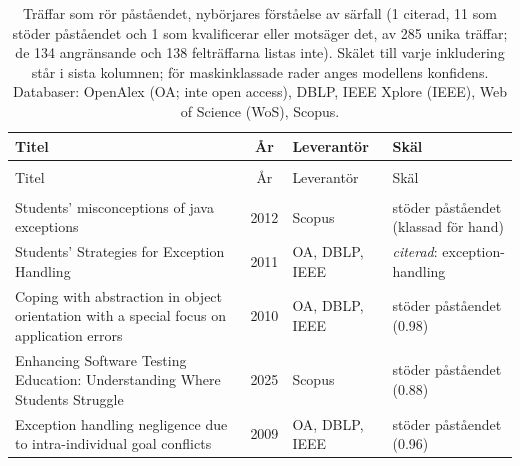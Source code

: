 
\begingroup\footnotesize
\begin{longtable}{@{}%
  >{\raggedright\arraybackslash}p{}c%
  >{\raggedright\arraybackslash}p{}%
  >{\raggedright\arraybackslash}p{}@{}}
\caption{Träffar som rör påståendet, nybörjares förståelse av särfall (1 citerad, 11 som stöder påståendet och 1 som kvalificerar eller motsäger det, av 285 unika träffar; de 134 angränsande och 138 felträffarna listas inte). Skälet till varje inkludering står i sista kolumnen; för maskinklassade rader anges modellens konfidens. Databaser: OpenAlex (OA; inte open access), DBLP, IEEE Xplore (IEEE), Web of Science (WoS), Scopus.}\label{tab:sok-nyborjare}\\
\toprule
Titel & År & Leverantör & Skäl \\
\midrule
\endfirsthead
\multicolumn{4}{@{}l}{\emph{\tablename~\thetable{} (\GetTranslation{continued})}}\\
\toprule
Titel & År & Leverantör & Skäl \\
\midrule
\endhead
\midrule \multicolumn{4}{r@{}}{\emph{\GetTranslation{continued on the next page}}}\\
\endfoot
\bottomrule
\endlastfoot
Students' misconceptions of java exceptions & 2012 & Scopus & stöder påståendet (klassad för hand) \\
Students' Strategies for Exception Handling & 2011 & OA, DBLP, IEEE & \emph{citerad}: exception-handling \\
Coping with abstraction in object orientation with a special focus on application errors & 2010 & OA, DBLP, IEEE & stöder påståendet (0.98) \\
Enhancing Software Testing Education: Understanding Where Students Struggle & 2025 & Scopus & stöder påståendet (0.88) \\
Exception handling negligence due to intra-individual goal conflicts & 2009 & OA, DBLP, IEEE & stöder påståendet (0.96) \\

\end{longtable}
